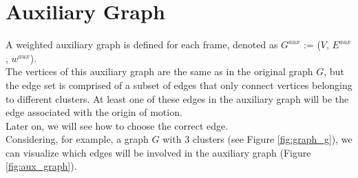 \chapter{Auxiliary Graph}

A weighted auxiliary graph is defined for each frame, denoted as $G^{aux}$ := ($V$, $E^{aux}$, $w^{aux}$). \\
The vertices of this auxiliary graph are the same as in the original
graph $G$, but the edge set is comprised of a subset of edges that only connect vertices belonging to different clusters. 
At least one of these edges in the auxiliary graph will be the edge associated with the origin of motion. \\
Later on, we will see how to choose the correct edge.
\\

Considering, for example, a graph $G$ with 3 clusters (see Figure \ref{fig:graph_g}), we can visualize which edges will be involved in the auxiliary graph (Figure \ref{fig:aux_graph}).
